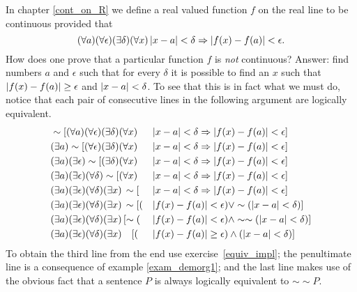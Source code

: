 \begin{exam}\label{exam_not_cont} In chapter \ref{cont_on_R} we define a real valued function
$f$ on the real line to be continuous provided that
  \[(\forall a)(\forall \epsilon)(\exists \delta)(\forall x)\,\lvert x-a\rvert
          < \delta \Rightarrow \lvert f(x) - f(a)\rvert < \epsilon.\]
How does one prove that a particular function $f$ is \emph{not} continuous?  Answer: find
numbers $a$ and $\epsilon$ such that for every $\delta$ it is possible to find an $x$ such
that $\lvert f(x) - f(a)\rvert \ge \epsilon$ and $\lvert x - a\rvert < \delta$. To see that this is in fact
what we must do, notice that each pair of consecutive lines in the following argument are
logically equivalent.
\begin{alignat*}{2}
  &\sim[(\forall a)(\forall \epsilon)(\exists \delta)(\forall x)\,
          &&\lvert x-a\rvert < \delta \Rightarrow
          \lvert f(x) - f(a)\rvert < \epsilon] \\
  &(\exists a)\sim[(\forall \epsilon)(\exists \delta)(\forall x)\,
          &&\lvert x-a\rvert < \delta \Rightarrow
          \lvert f(x) - f(a)\rvert < \epsilon] \\
  &(\exists a)(\exists \epsilon)\sim[(\exists \delta)(\forall x)\,
          &&\lvert x-a\rvert <  \delta \Rightarrow
          \lvert f(x) - f(a)\rvert < \epsilon] \\
  &(\exists a)(\exists \epsilon)(\forall \delta)\sim[(\forall x)\,
          &&\lvert x-a\rvert <  \delta \Rightarrow
          \lvert f(x) - f(a)\rvert < \epsilon] \\
  &(\exists a)(\exists \epsilon)(\forall \delta)(\exists x)\,
          \sim [&&\lvert x - a\rvert <  \delta \Rightarrow
          \lvert f(x) - f(a)\rvert < \epsilon] \\
  &(\exists a)(\exists \epsilon)(\forall \delta)(\exists x)\,
          \sim [(&&\lvert f(x) - f(a)\rvert < \epsilon)
          \lor \sim (\lvert x - a\rvert < \delta)] \\
  &(\exists a)(\exists \epsilon)(\forall \delta)(\exists x)\,
          [\sim (&&\lvert f(x) - f(a)\rvert < \epsilon)
          \land \sim\sim(\lvert x - a\rvert < \delta)] \\
  &(\exists a)(\exists \epsilon)(\forall \delta)(\exists x)
          \quad[(&&\lvert f(x) - f(a)\rvert \ge \epsilon)
          \land (\lvert x - a\rvert < \delta)]
\end{alignat*}
To obtain the third line from the end use exercise~\ref{equiv_impl};  the penultimate line is
a consequence of example \ref{exam_demorg1};  and the last line makes use of the obvious fact
that a sentence $P$ is always logically equivalent to $\sim\sim P$.
\end{exam}


